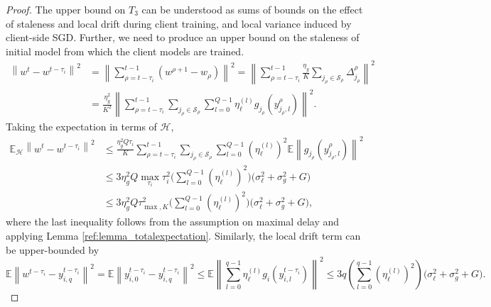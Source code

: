 \documentclass[twoside]{article}
\newcommand{\calS}{\mathcal{S}}
\newcommand{\norm}[1]{\left\lVert#1\right\rVert}
\begin{document}
\begin{proof}
The upper bound on $T_3$ can be understood as sums of bounds on the effect of staleness and local drift during client training, and local variance induced by client-side SGD. Further, we need to produce an upper bound on the staleness of initial model from which the client models are trained.
\begin{equation}
    \begin{aligned}
     \norm{w^t - w^{t-\tau_i}}^2 &= \norm{\sum^{t-1}_{\rho=t-\tau_i} (w^{\rho+1} - w_{\rho}) }^2
= \norm{\sum^{t-1}_{\rho=t-\tau_i} \frac{\eta_g}{K} \sum_{j_\rho \in \calS_{\rho}} \Delta_{j_\rho}^{\rho} }^2 \\
&=  \frac{\eta^2_g}{K^2}\norm{\sum^{t-1}_{\rho=t-\tau_i} \sum_{j_\rho \in \calS_{\rho}} \sum_{l=0}^{Q-1} \eta^{(l)}_{\ell}  g_{j_\rho}(y^{\rho}_{j_\rho, l}) }^2.
\end{aligned}
\label{eq:stalenss_UB}
\end{equation}
Taking the expectation in terms of $\mathcal{H}$,
\begin{equation}
    \begin{aligned}
     \mathbb{E}_{\mathcal{H}}\norm{w^t - w^{t-\tau_i}}^2 &\leq \frac{\eta^2_g Q  \tau_i}{K} \sum^{t-1}_{\rho=t-\tau_i} \sum_{j_\rho \in \calS_{\rho}} \sum_{l=0}^{Q-1} (\eta^{(l)}_{\ell} )^2 \mathbb{E}\norm{ g_{j_\rho}(y^{\rho}_{j_\rho, l}) }^2 \\
     &\leq 3 \eta^2_g Q  \max_{\tau_i} \tau_i^2  \Big(\sum_{l=0}^{Q-1} (\eta^{(l)}_{\ell})^2\Big) \Big(\sigma^2_{\ell} + \sigma^2_g + G\Big) \\
&\leq 3 \eta^2_g Q \tau_{\max, K}^2 \Big(\sum_{l=0}^{Q-1} (\eta^{(l)}_{\ell})^2\Big) \Big(\sigma^2_{\ell} + \sigma^2_g  + G\Big),
\end{aligned}
\end{equation}
where the last inequality follows from the assumption on maximal delay and applying Lemma \ref{ref:lemma_totalexpectation}. Similarly, the local drift term can be upper-bounded by
\begin{equation}
     \mathbb{E}\norm{w^{t-\tau_i} - y^{t-\tau_i}_{i,q}}^2 = \mathbb{E}\norm{y^{t-\tau_i}_{i,0} - y^{t-\tau_i}_{i,q}}^2
    \leq \mathbb{E} \norm{\sum_{l=0}^{q-1}  \eta^{(l)}_{\ell}g_i(y^{t-\tau_i}_{i,l}) }^2 
    \leq 3 q \left(\sum_{l=0}^{q-1}  (\eta^{(l)}_{\ell})^2 \right)\Big(\sigma^2_{\ell} + \sigma^2_g + G\Big).
\end{equation}

\end{proof}
\end{document}
